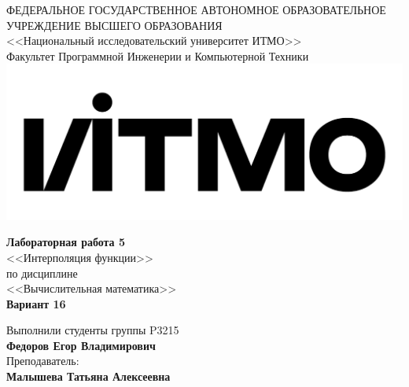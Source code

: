 \begin{titlepage}
	\thispagestyle{firststyle}
	\begin{center}
		ФЕДЕРАЛЬНОЕ ГОСУДАРСТВЕННОЕ АВТОНОМНОЕ ОБРАЗОВАТЕЛЬНОЕ УЧРЕЖДЕНИЕ ВЫСШЕГО ОБРАЗОВАНИЯ\\
		\vspace{0.5cm}
		<<Национальный исследовательский университет ИТМО>>\\
		Факультет Программной Инженерии и Компьютерной Техники \\
		\vspace{1cm}
		\includegraphics[scale=0.1]{img/itmo_logo.png}
	\end{center}

	\vspace{1cm}

	\begin{center}
		\large
    \textbf{Лабораторная работа \textnumero{} 5}\\
		<<Интерполяция функции>> \\
		по дисциплине\\
		<<Вычислительная математика>> \\
    \textbf{Вариант \textnumero{} 16}
	\end{center}

	\vspace{2cm}

	\begin{flushright}
		Выполнили студенты  группы P3215\\
		\textbf{Федоров Егор Владимирович} \\
		Преподаватель: \\
		\textbf{Малышева Татьяна Алексеевна}\\
	\end{flushright}

\end{titlepage}
